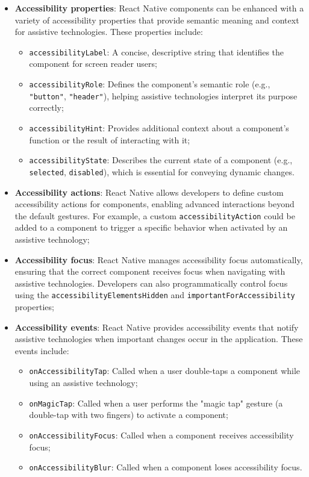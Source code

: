 \begin{itemize}
    \item \textbf{Accessibility properties}: React Native components can be enhanced with a variety of accessibility properties that provide semantic meaning and context for assistive technologies. These properties include:
    \begin{itemize}
        \item \texttt{accessibilityLabel}: A concise, descriptive string that identifies the component for screen reader users;
        \item \texttt{accessibilityRole}: Defines the component's semantic role (e.g., \texttt{"button"}, \texttt{"header"}), helping assistive technologies interpret its purpose correctly;
        \item \texttt{accessibilityHint}: Provides additional context about a component's function or the result of interacting with it;
        \item \texttt{accessibilityState}: Describes the current state of a component (e.g., \texttt{selected}, \texttt{disabled}), which is essential for conveying dynamic changes.
    \end{itemize}
    
    \item \textbf{Accessibility actions}: React Native allows developers to define custom accessibility actions for components, enabling advanced interactions beyond the default gestures. For example, a custom \texttt{accessibilityAction} could be added to a component to trigger a specific behavior when activated by an assistive technology;
    
    \item \textbf{Accessibility focus}: React Native manages accessibility focus automatically, ensuring that the correct component receives focus when navigating with assistive technologies. Developers can also programmatically control focus using the \texttt{accessibilityElementsHidden} and \texttt{importantForAccessibility} properties;
    
    \item \textbf{Accessibility events}: React Native provides accessibility events that notify assistive technologies when important changes occur in the application. These events include:
    \begin{itemize}
        \item \texttt{onAccessibilityTap}: Called when a user double-taps a component while using an assistive technology;
        \item \texttt{onMagicTap}: Called when a user performs the "magic tap" gesture (a double-tap with two fingers) to activate a component;
        \item \texttt{onAccessibilityFocus}: Called when a component receives accessibility focus;
        \item \texttt{onAccessibilityBlur}: Called when a component loses accessibility focus.
    \end{itemize}
\end{itemize}

